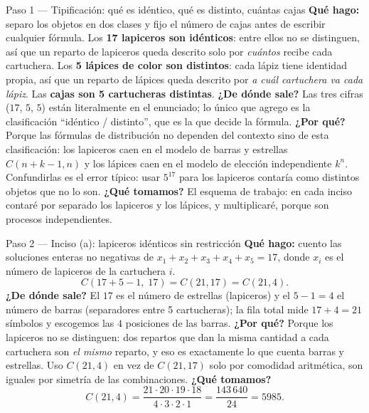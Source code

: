 \documentclass[11pt]{article}
\begin{document}
\begin{paso}{Paso 1 --- Tipificación: qué es idéntico, qué es distinto, cuántas cajas}
\textbf{Qué hago:} separo los objetos en dos clases y fijo el número de cajas antes de escribir cualquier fórmula.
Los \textbf{17 lapiceros son idénticos}: entre ellos no se distinguen, así que un reparto de lapiceros queda descrito solo por \emph{cuántos} recibe cada cartuchera. Los \textbf{5 lápices de color son distintos}: cada lápiz tiene identidad propia, así que un reparto de lápices queda descrito por \emph{a cuál cartuchera va cada lápiz}. Las \textbf{cajas son 5 cartucheras distintas}.
\textbf{¿De dónde sale?} Las tres cifras ($17$, $5$, $5$) están literalmente en el enunciado; lo único que agrego es la clasificación ``idéntico / distinto'', que es la que decide la fórmula.
\textbf{¿Por qué?} Porque las fórmulas de distribución no dependen del contexto sino de esta clasificación: los lapiceros caen en el modelo de barras y estrellas $C(n+k-1,n)$ y los lápices caen en el modelo de elección independiente $k^n$. Confundirlas es el error típico: usar $5^{17}$ para los lapiceros contaría como distintos objetos que no lo son.
\textbf{¿Qué tomamos?} El esquema de trabajo: en cada inciso contaré por separado los lapiceros y los lápices, y multiplicaré, porque son procesos independientes.
\end{paso}

\begin{paso}{Paso 2 --- Inciso (a): lapiceros idénticos sin restricción}
\textbf{Qué hago:} cuento las soluciones enteras no negativas de $x_1+x_2+x_3+x_4+x_5=17$, donde $x_i$ es el número de lapiceros de la cartuchera $i$.
\[
C(17+5-1,\;17)=C(21,17)=C(21,4).
\]
\textbf{¿De dónde sale?} El $17$ es el número de estrellas (lapiceros) y el $5-1=4$ el número de barras (separadores entre 5 cartucheras); la fila total mide $17+4=21$ símbolos y escogemos las $4$ posiciones de las barras.
\textbf{¿Por qué?} Porque los lapiceros no se distinguen: dos repartos que dan la misma cantidad a cada cartuchera son \emph{el mismo} reparto, y eso es exactamente lo que cuenta barras y estrellas. Uso $C(21,4)$ en vez de $C(21,17)$ solo por comodidad aritmética, son iguales por simetría de las combinaciones.
\textbf{¿Qué tomamos?}
\[
C(21,4)=\frac{21\cdot 20\cdot 19\cdot 18}{4\cdot 3\cdot 2\cdot 1}
=\frac{143\,640}{24}=5985 .
\]
\end{paso}
\end{document}

